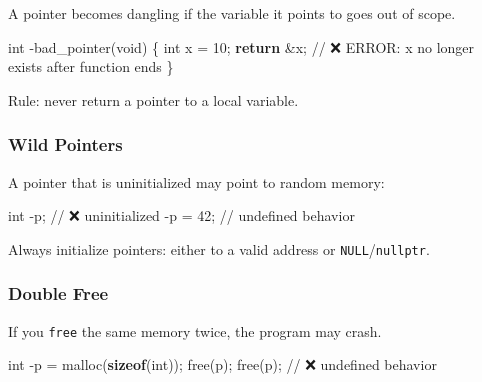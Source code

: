 \documentclass[
  letterpaper,
  DIV=11,
  numbers=noendperiod]{scrreprt}
\newenvironment{Shaded}{\begin{snugshade}}{\end{snugshade}}
\newcommand{\CommentTok}[1]{\textcolor[rgb]{0.37,0.37,0.37}{#1}}
\newcommand{\ControlFlowTok}[1]{\textcolor[rgb]{0.00,0.23,0.31}{\textbf{#1}}}
\newcommand{\DataTypeTok}[1]{\textcolor[rgb]{0.68,0.00,0.00}{#1}}
\newcommand{\DecValTok}[1]{\textcolor[rgb]{0.68,0.00,0.00}{#1}}
\newcommand{\KeywordTok}[1]{\textcolor[rgb]{0.00,0.23,0.31}{\textbf{#1}}}
\newcommand{\NormalTok}[1]{\textcolor[rgb]{0.00,0.23,0.31}{#1}}
\newcommand{\OperatorTok}[1]{\textcolor[rgb]{0.37,0.37,0.37}{#1}}
\begin{document}
A pointer becomes dangling if the variable it points to goes out of
scope.

\begin{Shaded}
\begin{Highlighting}[]
\DataTypeTok{int} \OperatorTok{{-}}\NormalTok{bad\_pointer}\OperatorTok{(}\DataTypeTok{void}\OperatorTok{)} \OperatorTok{\{}
    \DataTypeTok{int}\NormalTok{ x }\OperatorTok{=} \DecValTok{10}\OperatorTok{;}
    \ControlFlowTok{return} \OperatorTok{\&}\NormalTok{x}\OperatorTok{;}   \CommentTok{// ❌ ERROR: x no longer exists after function ends}
\OperatorTok{\}}
\end{Highlighting}
\end{Shaded}

Rule: never return a pointer to a local variable.

\subsubsection{Wild Pointers}\label{wild-pointers}

A pointer that is uninitialized may point to random memory:

\begin{Shaded}
\begin{Highlighting}[]
\DataTypeTok{int} \OperatorTok{{-}}\NormalTok{p}\OperatorTok{;}  \CommentTok{// ❌ uninitialized}
\OperatorTok{{-}}\NormalTok{p }\OperatorTok{=} \DecValTok{42}\OperatorTok{;} \CommentTok{// undefined behavior}
\end{Highlighting}
\end{Shaded}

Always initialize pointers: either to a valid address or
\texttt{NULL}/\texttt{nullptr}.

\subsubsection{Double Free}\label{double-free}

If you \texttt{free} the same memory twice, the program may crash.

\begin{Shaded}
\begin{Highlighting}[]
\DataTypeTok{int} \OperatorTok{{-}}\NormalTok{p }\OperatorTok{=}\NormalTok{ malloc}\OperatorTok{(}\KeywordTok{sizeof}\OperatorTok{(}\DataTypeTok{int}\OperatorTok{));}
\NormalTok{free}\OperatorTok{(}\NormalTok{p}\OperatorTok{);}
\NormalTok{free}\OperatorTok{(}\NormalTok{p}\OperatorTok{);}   \CommentTok{// ❌ undefined behavior}
\end{Highlighting}
\end{Shaded}
\end{document}
